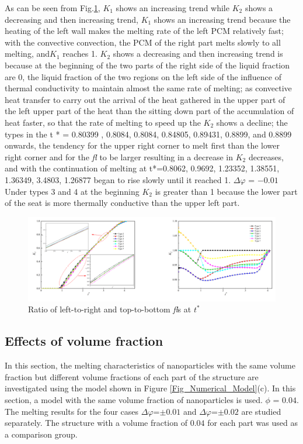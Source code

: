 \documentclass[preprint,12pt]{elsarticle}
\begin{document}
As can be seen from Fig.\ref{ratio}, $ K_1 $ shows an increasing trend while $ K_2 $ shows a decreasing and then increasing trend, $ K_1 $ shows an increasing trend because the heating of the left wall makes the melting rate of the left PCM relatively fast; with the convective convection, the PCM of the right part melts slowly to all melting, and$  K_1 $ reaches 1. $ K_2 $ shows a decreasing and then increasing trend is because at the beginning of the two parts of the right side of the liquid fraction are 0, the liquid fraction of the two regions on the left side of the influence of thermal conductivity to maintain almost the same rate of melting; as convective heat transfer to carry out the arrival of the heat gathered in the upper part of the left upper part of the heat than the sitting down part of the accumulation of heat faster, so that the rate of melting to speed up the $ K_2 $ shows a decline; the types in the t * = 0.80399 , 0.8084, 0.8084, 0.84805, 0.89431, 0.8899, and 0.8899 onwards, the tendency for the upper right corner to melt first than the lower right corner and for the \textit{fl} to be larger resulting in a decrease in $ K_2 $ decreases, and with the continuation of melting at t*=0.8062, 0.9692, 1.23352, 1.38551, 1.36349, 3.4803, 1.26877 began to rise slowly until it reached 1. $\Delta\varphi$ = $ -0.01 $ Under types 3 and 4 at the beginning $ K_2  $ is greater than 1 because the lower part of the seat is more thermally conductive than the upper left part.
\begin{figure}[H]
	\centering
	\includegraphics[scale=0.9]{Fig/ratio.png}
	\caption{Ratio of left-to-right and top-to-bottom \textit{fl}s at $ t^* $}
	\label{ratio} 
\end{figure}


	\subsection{Effects of volume fraction}

In this section, the melting characteristics of nanoparticles with the same volume fraction but different volume fractions of each part of the structure are investigated using the model shown in Figure \ref{Fig_Numerical_Model}(c). In this section, a model with the same volume fraction of nanoparticles is used.  $ \phi $ = $ 0.04 $. The melting results for the four cases  $\Delta\varphi$=$\pm0.01 $ and $\Delta\varphi$=$\pm0.02 $ are studied separately. The structure with a volume fraction of $ 0.04 $ for each part was used as a comparison group.
\end{document}
